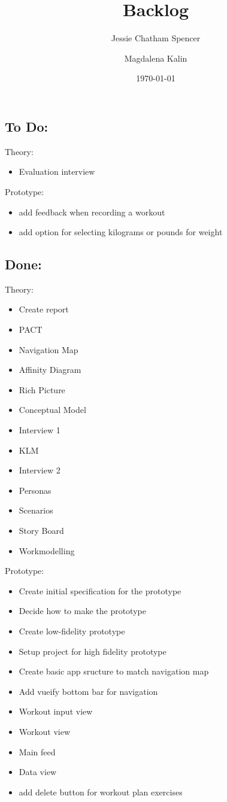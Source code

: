 \documentclass{article}
\title{Backlog}
\author{Jessie Chatham Spencer \and Magdalena Kalin}
\date{\today}
\begin{document}
\maketitle
\subsection*{To Do:}
Theory:
\begin{itemize}
\item Evaluation interview
\end{itemize}
Prototype:
\begin{itemize}
\item add feedback when recording a workout
\item add option for selecting kilograms or pounds for weight
\end{itemize}


\subsection*{Done:}
Theory:
\begin{itemize}
\item Create report
\item PACT 
\item Navigation Map
\item Affinity Diagram
\item Rich Picture
\item Conceptual Model
\item Interview 1
\item KLM
\item Interview 2
\item Personas
\item Scenarios
\item Story Board
\item Workmodelling
\end{itemize}
Prototype:
\begin{itemize}
\item Create initial specification for the prototype
\item Decide how to make the prototype
\item Create low-fidelity prototype
\item Setup project for high fidelity prototype
\item Create basic app sructure to match navigation map
\item Add vueify bottom bar for navigation
\item Workout input view
\item Workout view
\item Main feed
\item Data view
\item add delete button for workout plan exercises
\end{itemize}
\end{document}
